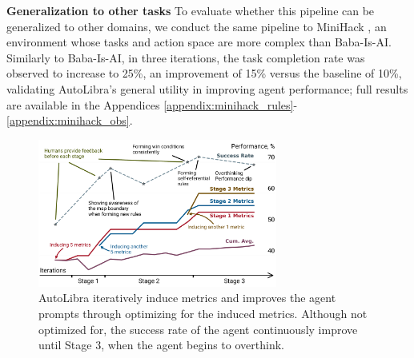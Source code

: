 \textbf{Generalization to other tasks} To evaluate whether this pipeline can be generalized
to other domains, we conduct the same pipeline to MiniHack \citep{samvelyan2021minihackplanetsandboxopenended},
an environment whose tasks and action space are more complex than Baba-Is-AI. Similarly
to Baba-Is-AI, in three iterations, the task completion rate was observed to increase
to 25\%, an improvement of 15\% versus the baseline of 10\%, validating
AutoLibra's general utility in improving agent performance; full results are available
in the Appendices \ref{appendix:minihack_rules}-\ref{appendix:minihack_obs}.

\begin{figure}
	\vspace{-20pt}
	\includegraphics[width=0.7\textwidth]{figs/running_maximum_plot.pdf}
	\vspace{-15pt}
	\caption{AutoLibra iteratively induce metrics and improves the agent prompts through optimizing for the induced metrics. Although not optimized for, the success rate of the agent continuously improve until Stage 3, when the agent begins to overthink.}
	\label{fig:autolibra_self_improving}
\end{figure}


